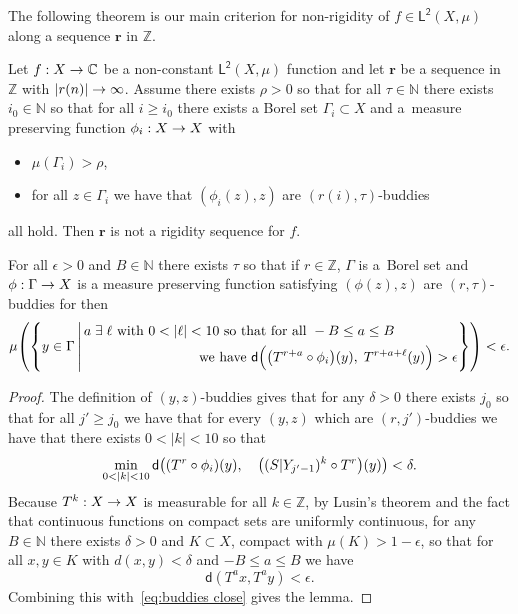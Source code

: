 \documentclass[AHL,Unicode,longabstracts,published]{cedram}
\newcommand{\N}{\mathbb{N}}
\newcommand{\Z}{\mathbb{Z}}
\newcommand{\bbC}{\mathbb{C}}
\newcommand{\metric}{\mathsf{d}}
\newcommand{\lp}{\mathsf{L}}
\newcommand{\ltwo}{\lp^{\!\mathsf{2}}}
\newcommand{\bfr}{\mathbf{r}}
\let\originalleft\left
\let\originalright\right
\renewcommand{\left}{\mathopen{}\mathclose\bgroup\originalleft}
\renewcommand{\right}{\aftergroup\egroup\originalright}
\renewcommand*{\to}{\mathchoice{\longrightarrow}{\rightarrow}{\rightarrow}{\rightarrow}}
\let\oldexists\exists
\renewcommand*{\exists}{\mathrel{\oldexists}}
\begin{document}
The following theorem is our main criterion for non-rigidity of $f \in \ltwo(X,\mu)$ along a sequence $\bfr$ in $\Z$.

\begin{theo}\label{thm:getting_constant weak}
Let $f:X \to \bbC$ be a non-constant $\ltwo(X,\mu)$ function and let $\bfr$ be a sequence in $\Z$ with $|r(n)| \to \infty$. Assume there exists $\rho>0$ so that for all $\tau \in \N$ there exists $ i_0 \in \N$ so that for all $i\geq i_0$ there exists a Borel set $\Gamma_i \subset X$ and a~measure preserving function $\phi_i : X \to X$ with
\begin{itemize}
\item $\mu(\Gamma_i) > \rho$,
\item for all $z \in \Gamma_i$ we have that $(\phi_i(z),z)$ are $(r(i),\tau)$-buddies
\end{itemize}
all hold. Then $\bfr$ is not a rigidity sequence for $f$.
\end{theo}

\begin{lemm}\label{lem:same power}
For all $\epsilon>0$ and $B\in \N$ there exists $\tau$ so that if $r \in \Z$, $\Gamma$ is a~Borel set and $\phi:\Gamma \to X$ is a measure preserving function satisfying $(\phi(z),z)$ are $(r,\tau)$-buddies for then
\[
\mu
\left(
\left\{ y\in \Gamma\,\middle|\,
\begin{aligned}
&a\exists \ell \text{ with }0<|\ell|<10 \text{ so that for all }-B\leq a\leq B\\
&\mkern150mu\text{we have } \metric \Big(\left(T^{r+a} \circ \phi_i\right)(y),\; T^{r+a+\ell}(y) \Big) > \epsilon
\end{aligned}
\right\}
\right) <\epsilon.
\]
\end{lemm}

\begin{proof}
The definition of $(y,z)$-buddies gives that for any $\delta>0$ there exists $j_0$ so that for all $j'\geq j_0$ we have that for every $(y,z)$ which are $(r,j')$-buddies we have that there exists $0<|k|<10$ so that
\begin{equation}\label{eq:buddies close}
\min_{0<|k|<10}\metric\left((T^{r} \circ \phi_i)(y),\quad\left((S|Y_{j'-1})^k \circ T^{r}\right)(y)\right)<\delta.
\end{equation}
Because $T^k:X \to X$ is measurable for all $k \in \Z$, by Lusin's theorem and the fact that continuous functions on compact sets are uniformly continuous, for any $B \in \N$ there exists $\delta>0$ and $K \subset X$, compact with $\mu(K)>1-\epsilon$, so that for all $x,y \in K$ with $d(x,y)<\delta$ and $-B\leq a\leq B $ we have
\[
\metric(T^ax,T^ay)<\epsilon.
\]
Combining this with~\eqref{eq:buddies close} gives the lemma.
\end{proof}
\end{document}
